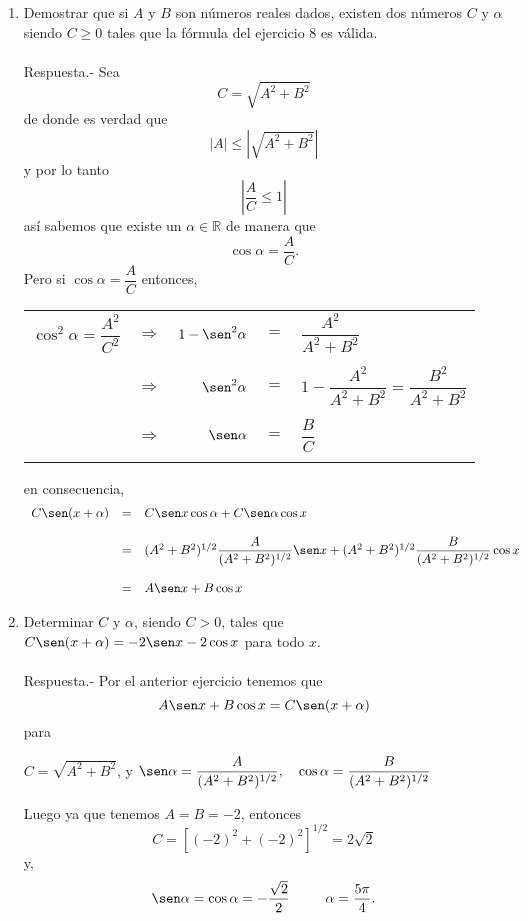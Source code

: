 \begin{enumerate}[\bfseries 1.]
\item Demostrar que si $A$ y $B$ son números reales dados, existen dos números $C$ y $\alpha$ siendo $C\geq 0$ tales que la fórmula del ejercicio 8 es válida.\\\\
    Respuesta.-\; Sea $$C = \sqrt{A^2+B^2}$$
    de donde es verdad que $$|A|\leq \left|\sqrt{A^2+B^2}\right|$$
    y por lo tanto $$\left|\dfrac{A}{C}\leq 1\right|$$
    así sabemos que existe un $\alpha \in \mathbb{R}$ de manera que $$\cos \alpha = \dfrac{A}{C}.$$
    Pero si $\cos \alpha = \dfrac{A}{C}$ entonces,
    \begin{center}
	\begin{tabular}{rcrcl}
	    $\cos^2 \alpha = \dfrac{A^2}{C^2}$&$\Longrightarrow$&$1-\sen^2 \alpha$& $=$ & $\dfrac{A^2}{A^2+B^2}$\\\\
	  &$\Longrightarrow$& $\sen^2 \alpha $ & $=$ & $1-\dfrac{A^2}{A^2 + B^2} = \dfrac{B^2}{A^2+B^2}$\\\\
	  &$\Longrightarrow$& $\sen \alpha$ & $=$ & $\dfrac{B}{C}$\\\\
	\end{tabular}
    \end{center}
    en consecuencia,
    $$\begin{array}{rcl}
	C\sen(x+\alpha) &=& C \sen x \cos \alpha + C \sen \alpha \cos x\\\\
			&=& (A^2+B^2)^{1/2} \dfrac{A}{(A^2+B^2)^{1/2}} \sen x + (A^2 + B^2)^{1/2} \dfrac{B}{(A^2+B^2)^{1/2}} \cos x\\\\ 
			&=&A\sen x + B\cos x
    \end{array}$$
    \vspace{.5cm}

\item Determinar $C$ y $ \alpha$, siendo $C>0$, tales que $C \sen (x+\alpha) = -2\sen x-2\cos x$ para todo $x$.\\\\
    Respuesta.-\; Por el anterior ejercicio tenemos que $$A\sen x + B\cos x = C \sen(x+\alpha)$$ para 
    \begin{center}
	$C=\sqrt{A^2+B^2}$, y $\sen \alpha = \dfrac{A}{(A^2+B^2)^{1/2}}, \quad \cos \alpha = \dfrac{B}{(A^2 + B^2)^{1/2}}$
    \end{center}
    Luego ya que tenemos $A=B=-2$, entonces
    $$C=\left[(-2)^2+(-2)^2\right]^{1/2} = 2\sqrt{2}$$
    y,
    $$\sen \alpha = \cos \alpha = -\dfrac{\sqrt{2}}{2} \; \qquad \; \alpha = \dfrac{5\pi}{4}.$$\\


\end{enumerate}
